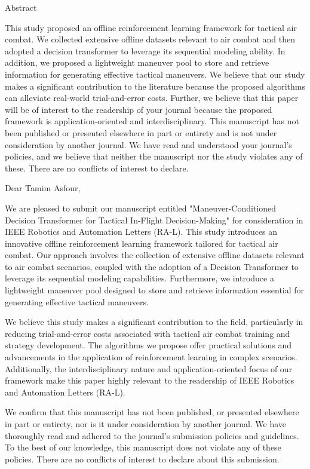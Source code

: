 Abstract

This study proposed an offline reinforcement learning framework for tactical air combat.
We collected extensive offline datasets relevant to air combat and then adopted a decision transformer to leverage its sequential modeling ability. 
In addition, we proposed a lightweight maneuver pool to store and retrieve information for generating effective tactical maneuvers.
We believe that our study makes a significant contribution to the literature because the proposed algorithms can alleviate real-world trial-and-error costs.
Further, we believe that this paper will be of interest to the readership of your journal because the proposed framework is application-oriented and interdisciplinary.
This manuscript has not been published or presented elsewhere in part or entirety and is not under consideration by another journal.
We have read and understood your journal's policies, and we believe that neither the manuscript nor the study violates any of these.
There are no conflicts of interest to declare.

Dear Tamim Asfour,

We are pleased to submit our manuscript entitled "Maneuver-Conditioned Decision Transformer for Tactical In-Flight Decision-Making" for consideration in IEEE Robotics and Automation Letters (RA-L). 
This study introduces an innovative offline reinforcement learning framework tailored for tactical air combat. 
Our approach involves the collection of extensive offline datasets relevant to air combat scenarios, coupled with the adoption of a Decision Transformer to leverage its sequential modeling capabilities. 
Furthermore, we introduce a lightweight maneuver pool designed to store and retrieve information essential for generating effective tactical maneuvers.

We believe this study makes a significant contribution to the field, particularly in reducing trial-and-error costs associated with tactical air combat training and strategy development. 
The algorithms we propose offer practical solutions and advancements in the application of reinforcement learning in complex scenarios. 
Additionally, the interdisciplinary nature and application-oriented focus of our framework make this paper highly relevant to the readership of IEEE Robotics and Automation Letters (RA-L).

We confirm that this manuscript has not been published, or presented elsewhere in part or entirety, nor is it under consideration by another journal. We have thoroughly read and adhered to the journal's submission policies and guidelines. To the best of our knowledge, this manuscript does not violate any of these policies. There are no conflicts of interest to declare about this submission.

